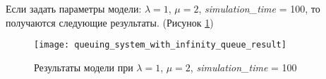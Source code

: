 \newpage
Если задать параметры модели: $\lambda = 1$, $\mu = 2$, \textit{simulation\textup{\_}time} = 100, то получаются следующие результаты. (Рисунок \ref{fig:queuing_system_with_infinity_queue_result})
\begin{figure}[h]
	\centering \texttt{[image: queuing\_system\_with\_infinity\_queue\_result]}
	\caption{Результаты модели при $\lambda = 1$, $\mu = 2$, \textit{simulation\textup{\_}time} = 100}
	\label{fig:queuing_system_with_infinity_queue_result}
\end{figure}
